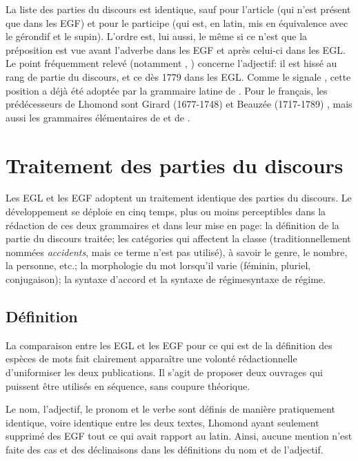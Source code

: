 \documentclass[output=paper]{langsci/langscibook}
\begin{document}
La liste des parties du discours est identique, sauf pour l’article (qui n’est présent que dans les EGF) et pour le participe (qui est, en latin, mis en équivalence avec le gérondif et le supin). L’ordre est, lui aussi, le même si ce n’est que la préposition est vue avant l’adverbe dans les EGF et après celui-ci dans les EGL. Le point fréquemment relevé (notamment \citealt{chervel_et_1977}, \citealt{colombat_grammaire_1999}) concerne l’adjectif: il est hissé au rang de partie du discours, et ce dès 1779 dans les EGL. Comme le signale \citet{colombat_grammaire_1999}, cette position a déjà été adoptée par la grammaire latine de \citet{goulier_grammaire_1773}. Pour le français, les prédécesseurs de Lhomond sont Girard (1677-1748) \citeyear{girard_les_1747} et Beauzée (1717-1789) \citeyear{beauzee_grammaire_1767}, mais aussi les grammaires élémentaires de \citet{royon_professeur_traite_1777} et de \citet{domerque_grammaire_1778}. 

\section{Traitement des parties du discours}

Les EGL et les EGF adoptent un traitement identique des parties du discours. Le développement se déploie en cinq temps, plus ou moins perceptibles dans la rédaction de ces deux grammaires et dans leur mise en page: la définition de la partie du discours traitée; les catégories qui affectent la classe (traditionnellement nommées \textit{accidents}, mais ce terme n’est pas utilisé), à savoir le genre, le nombre, la personne, etc.; la morphologie du mot lorsqu’il varie (féminin, pluriel, conjugaison); la syntaxe d’accord et la {syntaxe de régime}syntaxe de régime. 

\subsection{Définition}

La comparaison entre les EGL et les EGF pour ce qui est de la définition des espèces de mots fait clairement apparaître une volonté rédactionnelle d’uniformiser les deux publications. Il s’agit de proposer deux ouvrages qui puissent être utilisés en séquence, sans coupure théorique.

Le nom, l’adjectif, le pronom et le verbe sont définis de manière pratiquement identique, voire identique entre les deux textes, Lhomond ayant seulement supprimé des EGF tout ce qui avait rapport au latin. Ainsi, aucune mention n’est faite des cas et des déclinaisons dans les définitions du nom et de l’adjectif. 
\end{document}

